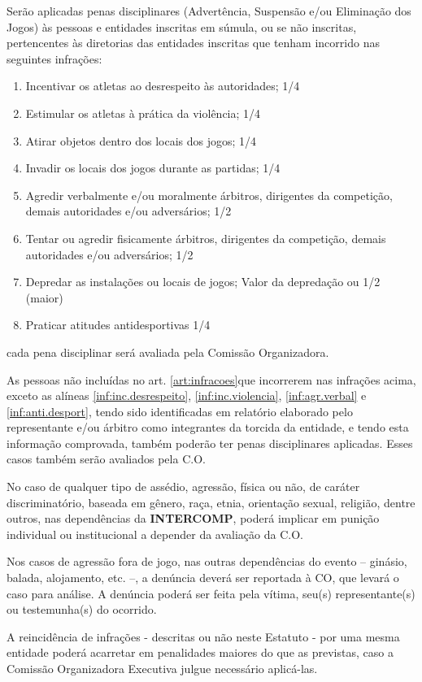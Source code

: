 \begin{article}
	\label{art:infracoes}
	Serão aplicadas penas disciplinares (Advertência, Suspensão e/ou Eliminação dos Jogos) às pessoas e entidades inscritas em súmula, ou se não inscritas, pertencentes às diretorias das entidades inscritas que tenham incorrido nas seguintes infrações:

	\begin{enumerate}[noitemsep]
		\item \label{inf:inc.desrespeito}
			Incentivar os atletas ao desrespeito às autoridades; 1/4
		\item \label{inf:inc.violencia}
			Estimular os atletas à prática da violência; 1/4
		\item Atirar objetos dentro dos locais dos jogos; 1/4
		\item Invadir os locais dos jogos durante as partidas; 1/4
		\item \label{inf:agr.verbal}
			Agredir verbalmente e/ou moralmente árbitros, dirigentes da competição, demais autoridades e/ou adversários; 1/2
		\item Tentar ou agredir fisicamente árbitros, dirigentes da competição, demais autoridades e/ou adversários; 1/2
		\item Depredar as instalações ou locais de jogos; Valor da depredação ou 1/2 (maior)
		\item \label{inf:anti.desport}
			Praticar atitudes antidesportivas 1/4
	\end{enumerate}

	\begin{xparagraph}
		cada pena disciplinar será avaliada pela Comissão Organizadora.
	\end{xparagraph}
\end{article}

\begin{article}
	As pessoas não incluídas no art. \ref{art:infracoes}\ulo que incorrerem nas infrações acima, exceto as alíneas \ref{inf:inc.desrespeito}, \ref{inf:inc.violencia}, \ref{inf:agr.verbal} e \ref{inf:anti.desport}, tendo sido identificadas em relatório elaborado pelo representante e/ou árbitro como integrantes da torcida da entidade, e tendo esta informação comprovada, também poderão ter penas disciplinares aplicadas. Esses casos também serão avaliados pela C.O.
\end{article}

\begin{article}
	No caso de qualquer tipo de assédio, agressão, física ou não, de caráter discriminatório, baseada em gênero, raça, etnia, orientação sexual, religião, dentre outros, nas dependências da \textbf{INTERCOMP}, poderá implicar em punição individual ou institucional a depender da avaliação da C.O.

	\begin{xparagraph}
		Nos casos de agressão fora de jogo, nas outras dependências do evento -- ginásio, balada, alojamento, etc. --, a denúncia deverá ser reportada à CO, que levará o caso para análise. A denúncia poderá ser feita pela vítima, seu(s) representante(s) ou testemunha(s) do ocorrido.
	\end{xparagraph}
\end{article}

\begin{article}
	A reincidência de infrações - descritas ou não neste Estatuto - por uma mesma entidade poderá acarretar em penalidades maiores do que as previstas, caso a Comissão Organizadora Executiva julgue necessário aplicá-las.
\end{article}
